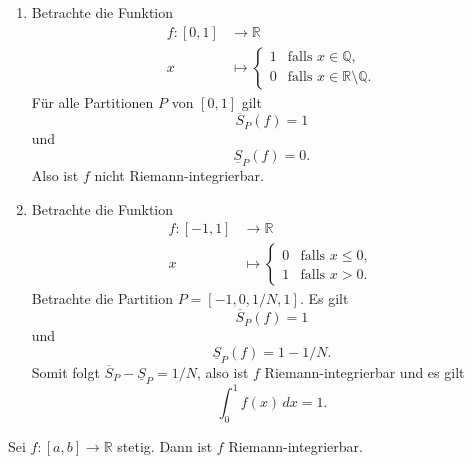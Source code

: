 \documentclass[../main.tex]{subfiles}
\begin{document}
\begin{examples}
  \leavevmode
  \begin{enumerate}[(1)]
    \item Betrachte die Funktion
      \begin{align*}
        f \colon [0, 1] & \to \mathbb{R} \\
        x & \mapsto 
        \begin{cases}
          1 & \text{falls $x \in \mathbb{Q}$},\\
          0 & \text{falls $x \in \mathbb{R} \setminus \mathbb{Q}$}.
        \end{cases}
      \end{align*}
      Für alle Partitionen $P$ von $[0, 1]$ gilt
      \[
        \overline S_P(f) = 1
      \]
      und
      \[
        \underline S_P(f) = 0.
      \]
      Also ist $f$ nicht Riemann-integrierbar.
    \item Betrachte die Funktion
      \begin{align*}
        f \colon [-1, 1] & \to \mathbb{R} \\
        x & \mapsto 
        \begin{cases}
          0 & \text{falls $x \leq 0$},\\
          1 & \text{falls $x > 0$}.
        \end{cases}
      \end{align*}
      Betrachte die Partition
      $P = [-1, 0, 1/N, 1]$.
      Es gilt
      \[
        \overline S_P(f) = 1
      \]
      und
      \[
        \underline S_P(f) = 1 - 1/N.
      \] 
      Somit folgt $\overline S_P - \underline S_P = 1/N$,
      also ist $f$ Riemann-integrierbar und es gilt
      \[
        \int_{0}^{1} f(x) \, dx = 1.
      \]
  \end{enumerate}
\end{examples}

\begin{theorem}\label{thm:continuous-integrable}
  Sei $f \colon [a, b] \to \mathbb{R}$ stetig. Dann ist $f$ 
  Riemann-integrierbar.
\end{theorem}
\end{document}
